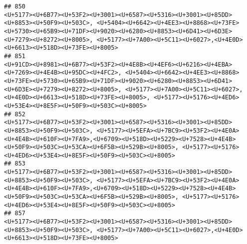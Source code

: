 \documentclass[
]{article}
\begin{document}
\begin{verbatim}
## 850                                                                                                                                                                                                                                                              <U+5177><U+6B77><U+53F2><U+3001><U+6587><U+5316><U+3001><U+85DD><U+8853><U+50F9><U+503C>, <U+5404><U+6642><U+4EE3><U+8868><U+73FE><U+5730><U+65B9><U+71DF><U+9020><U+6280><U+8853><U+6D41><U+6D3E><U+7279><U+8272><U+8005>, <U+5177><U+7A00><U+5C11><U+6027>,<U+4E0D><U+6613><U+518D><U+73FE><U+8005>
## 851                                                                                                                                                                                    <U+91CD><U+8981><U+6B77><U+53F2><U+4E8B><U+4EF6><U+6216><U+4EBA><U+7269><U+4E4B><U+95DC><U+4FC2>, <U+5404><U+6642><U+4EE3><U+8868><U+73FE><U+5730><U+65B9><U+71DF><U+9020><U+6280><U+8853><U+6D41><U+6D3E><U+7279><U+8272><U+8005>, <U+5177><U+7A00><U+5C11><U+6027>,<U+4E0D><U+6613><U+518D><U+73FE><U+8005>, <U+5177><U+5176><U+4ED6><U+53E4><U+8E5F><U+50F9><U+503C><U+8005>
## 852                                                                                                                                                                                                                                              <U+5177><U+6B77><U+53F2><U+3001><U+6587><U+5316><U+3001><U+85DD><U+8853><U+50F9><U+503C>, <U+5177><U+5EFA><U+7BC9><U+53F2><U+4E0A><U+4E4B><U+610F><U+7FA9>,<U+6709><U+518D><U+5229><U+7528><U+4E4B><U+50F9><U+503C><U+53CA><U+6F5B><U+529B><U+8005>, <U+5177><U+5176><U+4ED6><U+53E4><U+8E5F><U+50F9><U+503C><U+8005>
## 853                                                                                                                                                                                                                                              <U+5177><U+6B77><U+53F2><U+3001><U+6587><U+5316><U+3001><U+85DD><U+8853><U+50F9><U+503C>, <U+5177><U+5EFA><U+7BC9><U+53F2><U+4E0A><U+4E4B><U+610F><U+7FA9>,<U+6709><U+518D><U+5229><U+7528><U+4E4B><U+50F9><U+503C><U+53CA><U+6F5B><U+529B><U+8005>, <U+5177><U+5176><U+4ED6><U+53E4><U+8E5F><U+50F9><U+503C><U+8005>
## 857                                                                                                                                                                                                                                                                                                                                                                                                <U+5177><U+6B77><U+53F2><U+3001><U+6587><U+5316><U+3001><U+85DD><U+8853><U+50F9><U+503C>, <U+5177><U+7A00><U+5C11><U+6027>,<U+4E0D><U+6613><U+518D><U+73FE><U+8005>

\end{verbatim}
\end{document}
